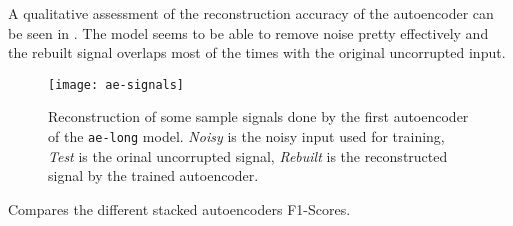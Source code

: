A qualitative assessment of the reconstruction accuracy of the autoencoder can be seen in . The model seems to be able to remove noise pretty effectively and the rebuilt signal overlaps most of the times with the original uncorrupted input. \\

\begin{figure}[h]
	\captionsetup{font=scriptsize, justification=centering}
    \centering
	\texttt{[image: ae-signals]}
    \caption{Reconstruction of some sample signals done by the first autoencoder of the \texttt{ae-long} model. {\it Noisy} is the noisy input used for training, {\it Test} is the orinal uncorrupted signal, {\it Rebuilt} is the reconstructed signal by the trained autoencoder.}
    \label{fig:img_signal_reconstruction}
\end{figure}

 Compares the different stacked autoencoders \mbox{F1-Scores}.

\begin{table}[!htbp]
\footnotesize
\captionsetup{font=scriptsize, justification=centering}
\centering
{}
\caption{F1-Scores for various stacked autoencoders, \texttt{long} prefix indicates the deeper version of the first autoencoder, as presented in , \texttt{short} prefix indicates the shallower version. \texttt{gaus} suffix indicates the model trained with inputs corrupted by gaussian noise, \texttt{zero} instead indicates input corruption with zero-masking.}
\label{ae_comparison_table}
\end{table}

